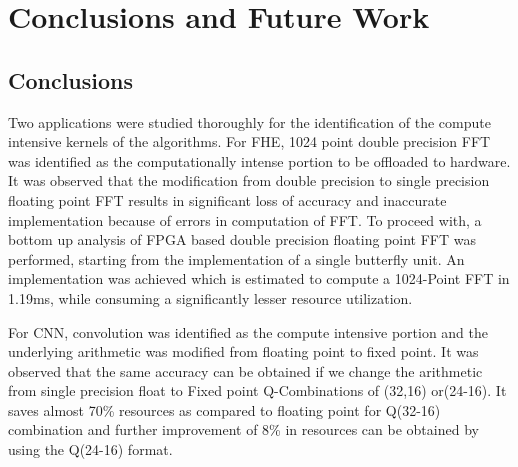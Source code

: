 \chapter{Conclusions and Future Work}\label{Chapter6}
\section{Conclusions}
Two applications were studied thoroughly for the identification of the compute intensive kernels of the algorithms. 
For FHE, 1024 point double precision FFT was identified as the computationally intense portion to be offloaded to hardware. 
It was observed that the modification from double precision to single precision floating point FFT results in significant loss of accuracy and inaccurate implementation because of errors in computation of FFT.
To proceed with, a bottom up analysis of FPGA based double precision floating point FFT was performed, starting from the implementation of a single butterfly unit. An implementation was achieved which is estimated to compute a 1024-Point FFT in 1.19ms, while consuming a significantly lesser resource utilization.

For CNN, convolution was identified as the compute intensive portion and the underlying arithmetic was modified from floating point to fixed point. It was observed that the same accuracy can be obtained if we change the arithmetic from single precision float to Fixed point Q-Combinations of (32,16) or(24-16).
It saves almost 70\% resources as compared to floating point for Q(32-16) combination and further improvement of 8\% in resources can be obtained by using the Q(24-16) format. 

